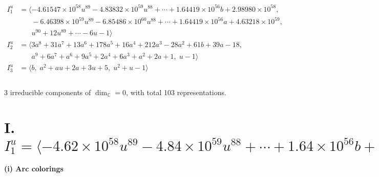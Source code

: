 \documentclass[1p]{elsarticle_modified}
\theoremstyle{definition}
\begin{document}
\begin{align*}
I^u_{1}&=\langle 
-4.61547\times10^{58} u^{89}-4.83832\times10^{59} u^{88}+\cdots+1.64419\times10^{56} b+2.98980\times10^{58},\\
\phantom{I^u_{1}}&\phantom{= \langle  }-6.46398\times10^{59} u^{89}-6.85486\times10^{60} u^{88}+\cdots+1.64419\times10^{56} a+4.63218\times10^{59},\\
\phantom{I^u_{1}}&\phantom{= \langle  }u^{90}+12 u^{89}+\cdots-6 u-1\rangle \\
I^u_{2}&=\langle 
3 a^8+31 a^7+13 a^6+178 a^5+16 a^4+212 a^3-28 a^2+61 b+39 a-18,\\
\phantom{I^u_{2}}&\phantom{= \langle  }a^9+6 a^7+a^6+9 a^5+2 a^4+6 a^3+a^2+2 a+1,\;u-1\rangle \\
I^u_{3}&=\langle 
b,\;a^2+a u+2 a+3 u+5,\;u^2+u-1\rangle \\
\\
\end{align*}
\raggedright * 3 irreducible components of $\dim_{\mathbb{C}}=0$, with total 103 representations.\\
\newpage
\renewcommand{\arraystretch}{1}
\centering \section*{I. $I^u_{1}= \langle -4.62\times10^{58} u^{89}-4.84\times10^{59} u^{88}+\cdots+1.64\times10^{56} b+2.99\times10^{58},\;-6.46\times10^{59} u^{89}-6.85\times10^{60} u^{88}+\cdots+1.64\times10^{56} a+4.63\times10^{59},\;u^{90}+12 u^{89}+\cdots-6 u-1 \rangle$}
\flushleft \textbf{(i) Arc colorings}\\
\end{document}
